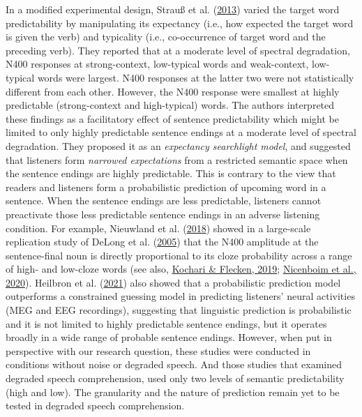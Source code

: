 \documentclass[a4paper, nobind]{templates/ociamthesis}
\begin{document}
In a modified experimental design, Strauß et al. (\protect\hyperlink{ref-Strauss2013}{2013}) varied the target word predictability by manipulating its expectancy (i.e., how expected the target word is given the verb) and typicality (i.e., co-occurrence of target word and the preceding verb).
They reported that at a moderate level of spectral degradation, N400 responses at strong-context, low-typical words and weak-context, low-typical words were largest.
N400 responses at the latter two were not statistically different from each other.
However, the N400 response were smallest at highly predictable (strong-context and high-typical) words.
The authors interpreted these findings as a facilitatory effect of sentence predictability which might be limited to only highly predictable sentence endings at a moderate level of spectral degradation.
They proposed it as an \emph{expectancy searchlight model}, and suggested that listeners form \emph{narrowed expectations} from a restricted semantic space when the sentence endings are highly predictable.
This is contrary to the view that readers and listeners form a probabilistic prediction of upcoming word in a sentence.
When the sentence endings are less predictable, listeners cannot preactivate those less predictable sentence endings in an adverse listening condition.
For example, Nieuwland et al. (\protect\hyperlink{ref-Nieuwland2018}{2018}) showed in a large-scale replication study of DeLong et al. (\protect\hyperlink{ref-Delong2005}{2005}) that the N400 amplitude at the sentence-final noun is directly proportional to its cloze probability across a range of high- and low-cloze words (see also, \protect\hyperlink{ref-Kochari2019}{Kochari \& Flecken, 2019}; \protect\hyperlink{ref-Nicenboim2020}{Nicenboim et al., 2020}).
Heilbron et al. (\protect\hyperlink{ref-Heilbron2021}{2021}) also showed that a probabilistic prediction model outperforms a constrained guessing model in predicting listeners' neural activities (MEG and EEG recordings),
suggesting that linguistic prediction is probabilistic and it is not limited to highly predictable sentence endings, but it operates broadly in a wide range of probable sentence endings.
However, when put in perspective with our research question, these studies were conducted in conditions without noise or degraded speech.
And those studies that examined degraded speech comprehension, used only two levels of semantic predictability (high and low).
The granularity and the nature of prediction remain yet to be tested in degraded speech comprehension.
\end{document}
